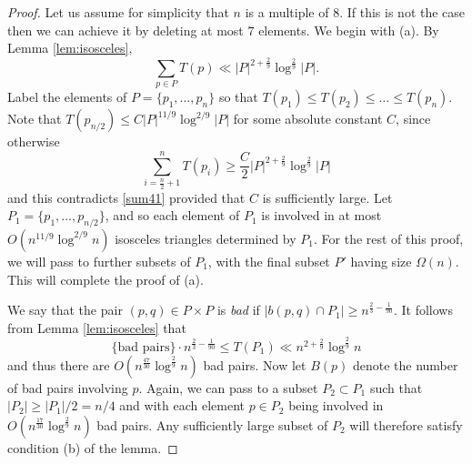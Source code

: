 \documentclass[11pt,oneside]{amsart}
\numberwithin{exercise}{subsection}
\begin{document}
\begin{proof}

Let us assume for simplicity that $n$ is a multiple of $8$. If this is not the case then we can achieve it by deleting at most $7$ elements. We begin with (a).  By Lemma \ref{lem:isosceles},
\begin{equation} \label{sum41}
\sum_{p \in P} T(p) \ll |P|^{2+\frac{2}{9}} \log^{\frac{2}{9}} |P|.
\end{equation}
Label the elements of $P=\{p_1,\dots , p_n\}$ so that $T(p_1) \leq T(p_2) \leq \dots \leq T(p_n)$. Note that $T(p_{n/2}) \leq C|P|^{11/9} \log^{2/9} |P| $ for some absolute constant $C$, since otherwise
\[
\sum_{i= \frac{n}{2}+1}^n T(p_i) \geq \frac{C}{2}|P|^{2+\frac{2}{9}} \log^{\frac{2}{9}}|P|
\]
and this contradicts \eqref{sum41} provided that $C$ is sufficiently large. Let $P_1 = \{p_1, \dots, p_{n/2} \}$, and so each element of $P_1$ is involved in at most $O(n^{11/9} \log^{2/9} n)$ isosceles triangles determined by $P_1$. For the rest of this proof, we will pass to further subsets of $P_1$, with the final subset $P'$ having size $\Omega(n)$. This will complete the proof of (a).


We say that the pair $(p,q) \in P \times P$ is \textit{bad} if $|b(p,q) \cap P_1| \geq n^{\frac{2}{3}-\frac{1}{90}}$. It follows from Lemma \ref{lem:isosceles} that 
\[
\{ \text{bad pairs} \}\cdot n^{\frac{2}{3}-\frac{1}{90}} \leq T(P_1) \ll n^{2+\frac{2}{9}}\log ^{\frac29}n
\]
and thus there are $O(n^\frac{47}{30}\log ^{\frac29}n)$ bad pairs. Now let $B(p)$ denote the number of bad pairs involving $p$. Again, we can pass to a subset $P_2 \subset P_1$ such that $|P_2| \geq |P_1|/2=n/4$ and with each element $p \in P_2$ being involved in $O(n^{\frac{17}{30}}\log ^{\frac29}n)$ bad pairs. Any sufficiently large subset of $P_2$ will therefore satisfy condition (b) of the lemma.


\end{proof}
\end{document}
